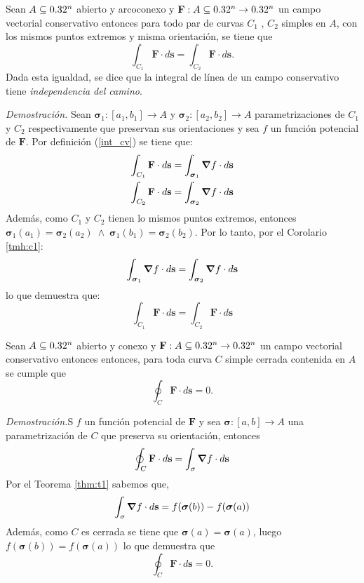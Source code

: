 \begin{corollary}\label{tmh:c2}  Sean $A\subseteq0.32^n$ abierto y arcoconexo y $\mathbf{F}:A\subseteq0.32^n\to0.32^n$  un campo vectorial conservativo entonces para todo par de curvas $C_1$ , $C_2$ simples en $A$, con los mismos puntos extremos y misma orientaci\'on, se tiene que
    \[
    \int_{C_1}\mathbf{F}\cdot d\mathbf{s}=\int_{C_2}\mathbf{F}\cdot d\mathbf{s}. 
    \]
    Dada esta igualdad, se dice que la integral de línea de un campo conservativo tiene \textit{independencia del camino}.

    \textit{Demostración.}   Sean $\boldsymbol{\sigma}_1:[a_1,b_1]\to A$  y $\boldsymbol{\sigma}_2:[a_2,b_2]\to A$  parametrizaciones de  $C_1$ y $C_2$ respectivamente que preservan sus orientaciones y sea  $f$ un funci\'on potencial de $\mathbf{F}$. Por definici\'on  (\ref{int_cv}) se tiene que:
    \begin{align*}
        \int_{C_1}\mathbf{F}\cdot d\mathbf{s}&=\int_{\boldsymbol{\sigma}_1}\grad f\cdot d\mathbf{s}\\
        \int_{C_2}\mathbf{F}\cdot d\mathbf{s}&=\int_{\boldsymbol{\sigma}_2}\grad f\cdot d\mathbf{s}
    \end{align*}
    Además, como $C_1$ y $C_2$ tienen lo mismos puntos extremos, entonces $\boldsymbol{\sigma}_1(a_1)=\boldsymbol{\sigma}_2(a_2)\;\land\;\boldsymbol{\sigma}_1(b_1)=\boldsymbol{\sigma}_2(b_2)$.
    Por lo tanto,  por el Corolario \ref{tmh:c1}:
    $$  \int_{\boldsymbol{\sigma}_1}\grad f\cdot d\mathbf{s}=\int_{\boldsymbol{\sigma}_2}\grad f\cdot d\mathbf{s} $$
     lo que demuestra que:   $$ \int_{C_1}\mathbf{F}\cdot d\mathbf{s}=\int_{C_2}\mathbf{F}\cdot d\mathbf{s}$$
   
\end{corollary}

\begin{corollary}\label{tmh:c3} Sean $A\subseteq0.32^n$ abierto y conexo y $\mathbf{F}:A\subseteq0.32^n\to0.32^n$  un campo vectorial conservativo entonces  entonces, para toda curva $C$ simple cerrada contenida en $A$ se cumple que
    $$\oint_C\mathbf{F}\cdot d\mathbf{s}=0.$$
    

    \textit{Demostración.}S  $f$ un funci\'on potencial de $\mathbf{F}$  y sea $\boldsymbol{\sigma}:[a,b]\to A$  una  parametrizaci\'on de  $C$   que preserva su  orientaci\'on, entonces
    \begin{equation*}
        \oint_C\mathbf{F}\cdot d\mathbf{s}=\int_{\sigma}\grad f\cdot d\mathbf{s}
    \end{equation*}
  Por el Teorema \ref{thm:t1} sabemos que,
    \begin{equation*}
        \int_{\sigma}\grad f\cdot d\mathbf{s}=f(\boldsymbol{\sigma}(b))-f(\boldsymbol{\sigma}(a))
    \end{equation*}
    Adem\'as,  como $C$ es cerrada se tiene que $\boldsymbol{\sigma}(a)=\boldsymbol{\sigma}(a)$, luego $f(\boldsymbol{\sigma}(b))=f(\boldsymbol{\sigma}(a))$
 lo que demuestra que  $$\oint_C\mathbf{F}\cdot d\mathbf{s}=0.$$
\end{corollary}





